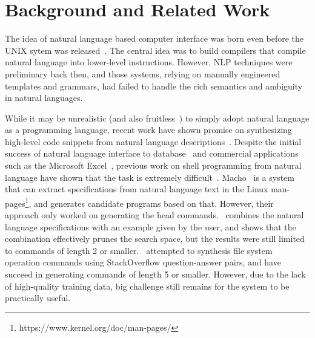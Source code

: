 \section{Background and Related Work}
The idea of natural language based computer interface was born even before the UNIX sytem was released~\cite{sammet1966use,Ballard:1979:PNL:800177.810072}. The central idea was to build compilers that compile natural language into lower-level instructions. However, NLP techniques were preliminary back then, and those systems, relying on manually engineered templates and grammars, had failed to handle the rich semantics and ambiguity in natural languages. 

While it may be unrealistic (and also fruitless~\cite{Dijkstra:1978:FNL:647639.760596}) to simply adopt natural language as a programming language, recent work have shown promise on synthesizing high-level code snippets from natural language descriptions~\cite{gulwani2010dimensions,DBLP:journals/corr/DesaiGHJKMRR15}.  
Despite the initial success of natural language interface to database~\cite{Popescu:2003:TTN:604045.604070,DBLP:journals/pvldb/LiJ14} and commercial applications such as the Microsoft Excel~\cite{DBLP:conf/mobisys/LeGS13,DBLP:conf/acl/QuirkMG15}, previous work on shell programming from natural language have shown that the task is extremely difficult~\cite{bashsynthesis,cozzie2011macho,cozzie2012macho,Pedersen-Report}. 
Macho~\cite{cozzie2011macho} is a system that can extract specifications from natural language text in the Linux man-pages\footnote{https://www.kernel.org/doc/man-pages/}, and generates candidate programs based on that. However, their approach only worked on generating the head commands.~\cite{cozzie2012macho} combines the natural language specifications with an example given by the user, and shows that the combination effectively prunes the search space, but the results were still limited to commands of length 2 or smaller.~\cite{bashsynthesis} attempted to synthesis file system operation commands using StackOverflow question-answer pairs, and have succeed in generating commands of length 5 or smaller. However, due to the lack of high-quality training data, big challenge still remains for the system to be practically useful.

